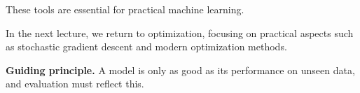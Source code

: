 \medskip

\noindent
These tools are essential for practical machine learning.

\medskip

\noindent
In the next lecture, we return to optimization, focusing on practical aspects such as stochastic gradient descent and modern optimization methods.

\medskip

\noindent
\textbf{Guiding principle.}  
A model is only as good as its performance on unseen data, and evaluation must reflect this.